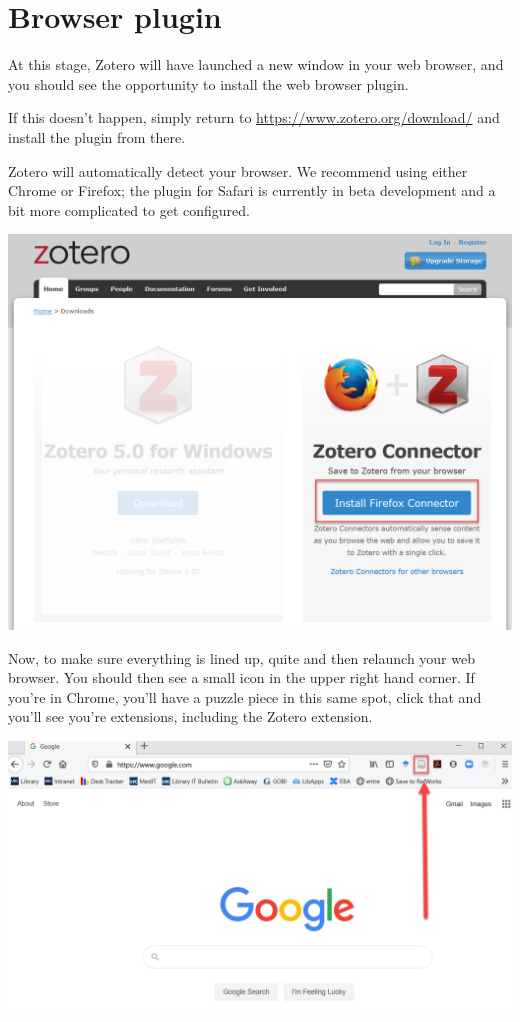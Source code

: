 \documentclass[
]{book}
\begin{document}
\hypertarget{browser-plugin}{%
\section{Browser plugin}\label{browser-plugin}}

At this stage, Zotero will have launched a new window in your web browser, and you should see the opportunity to install the web browser plugin.

If this doesn't happen, simply return to \url{https://www.zotero.org/download/} and install the plugin from there.

Zotero will automatically detect your browser. We recommend using either Chrome or Firefox; the plugin for Safari is currently in beta development and a bit more complicated to get configured.

\includegraphics{images/Z_BrowserPluginZotero.png}

Now, to make sure everything is lined up, quite and then relaunch your web browser. You should then see a small icon in the upper right hand corner. If you're in Chrome, you'll have a puzzle piece in this same spot, click that and you'll see you're extensions, including the Zotero extension.

\includegraphics{images/Z_PluginSuccess.png}
\end{document}
